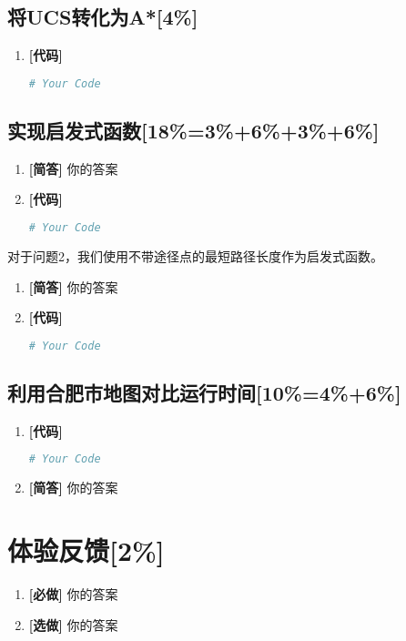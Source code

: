 \documentclass{article}
\begin{document}
\subsection{将UCS转化为A*[4\%]}

\begin{enumerate}[label=(\alph*), start=1]
    \item \textbf{[代码]} %
    \begin{lstlisting}[language=Python]
    # Your Code
    \end{lstlisting}
\end{enumerate}

\subsection{实现启发式函数[18\%=3\%+6\%+3\%+6\%]}

\begin{enumerate}[label=(\alph*), start=2]
    \item \textbf{[简答]} %
    你的答案
    \item \textbf{[代码]} %
    \begin{lstlisting}[language=Python]
    # Your Code
    \end{lstlisting}
\end{enumerate}

对于问题2，我们使用不带途径点的最短路径长度作为启发式函数。

\begin{enumerate}[label=(\alph*), start=4]
    \item \textbf{[简答]} %
    你的答案
    \item \textbf{[代码]} %
    \begin{lstlisting}[language=Python]
    # Your Code
    \end{lstlisting}
\end{enumerate}

\subsection{利用合肥市地图对比运行时间[10\%=4\%+6\%]}

\begin{enumerate}[label=(\alph*), start=6]
    \item \textbf{[代码]} %
    \begin{lstlisting}[language=Python]
    # Your Code
    \end{lstlisting}
    \item \textbf{[简答]} %
    你的答案
\end{enumerate}

\section*{体验反馈[2\%]}

\begin{enumerate}[label=(\alph*), start=1]
    \item \textbf{[必做]} %
    你的答案
    \item \textbf{[选做]} %
    你的答案
\end{enumerate}
\end{document}
